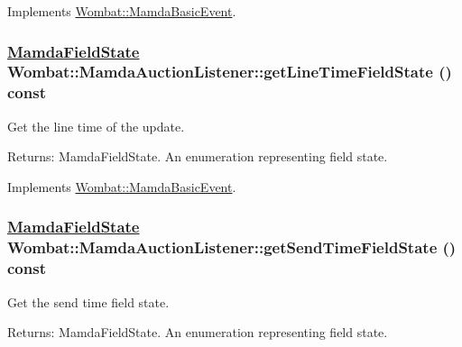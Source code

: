 Implements \hyperlink{classWombat_1_1MamdaBasicEvent_a61a566e3442181ca1fadc4524296cd0}{Wombat::Mamda\-Basic\-Event}.\hypertarget{classWombat_1_1MamdaAuctionListener_c73a0f3c19ad3a9106925e6fa89599ef}{
\subsubsection[getLineTimeFieldState]{\setlength{\rightskip}{0pt plus 5cm}\hyperlink{namespaceWombat_93aac974f2ab713554fd12a1fa3b7d2a}{Mamda\-Field\-State} Wombat::Mamda\-Auction\-Listener::get\-Line\-Time\-Field\-State () const}}
\label{classWombat_1_1MamdaAuctionListener_c73a0f3c19ad3a9106925e6fa89599ef}


Get the line time of the update. 

\begin{Desc}
\item[Returns:]Mamda\-Field\-State. An enumeration representing field state. \end{Desc}


Implements \hyperlink{classWombat_1_1MamdaBasicEvent_eb06352aca3280c5e89bad7a3b185cdf}{Wombat::Mamda\-Basic\-Event}.\hypertarget{classWombat_1_1MamdaAuctionListener_721c4b24c7a188038665f28fc03e45c2}{
\subsubsection[getSendTimeFieldState]{\setlength{\rightskip}{0pt plus 5cm}\hyperlink{namespaceWombat_93aac974f2ab713554fd12a1fa3b7d2a}{Mamda\-Field\-State} Wombat::Mamda\-Auction\-Listener::get\-Send\-Time\-Field\-State () const}}
\label{classWombat_1_1MamdaAuctionListener_721c4b24c7a188038665f28fc03e45c2}


Get the send time field state. 

\begin{Desc}
\item[Returns:]Mamda\-Field\-State. An enumeration representing field state. \end{Desc}


